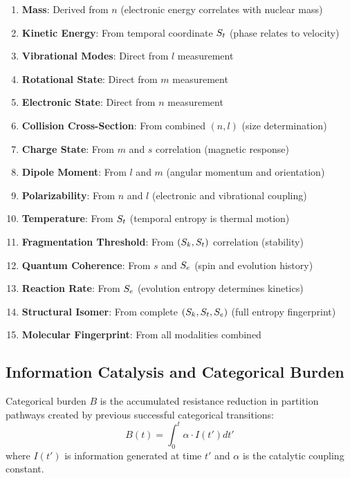 \begin{enumerate}
\item \textbf{Mass}: Derived from $n$ (electronic energy correlates with nuclear mass)
\item \textbf{Kinetic Energy}: From temporal coordinate $S_t$ (phase relates to velocity)
\item \textbf{Vibrational Modes}: Direct from $l$ measurement
\item \textbf{Rotational State}: Direct from $m$ measurement
\item \textbf{Electronic State}: Direct from $n$ measurement
\item \textbf{Collision Cross-Section}: From combined $(n,l)$ (size determination)
\item \textbf{Charge State}: From $m$ and $s$ correlation (magnetic response)
\item \textbf{Dipole Moment}: From $l$ and $m$ (angular momentum and orientation)
\item \textbf{Polarizability}: From $n$ and $l$ (electronic and vibrational coupling)
\item \textbf{Temperature}: From $S_t$ (temporal entropy is thermal motion)
\item \textbf{Fragmentation Threshold}: From $(S_k, S_t)$ correlation (stability)
\item \textbf{Quantum Coherence}: From $s$ and $S_e$ (spin and evolution history)
\item \textbf{Reaction Rate}: From $S_e$ (evolution entropy determines kinetics)
\item \textbf{Structural Isomer}: From complete $(S_k, S_t, S_e)$ (full entropy fingerprint)
\item \textbf{Molecular Fingerprint}: From all modalities combined
\end{enumerate}

\subsection{Information Catalysis and Categorical Burden}

\begin{definition}
\label{def:categorical_burden}
Categorical burden $B$ is the accumulated resistance reduction in partition pathways created by previous successful categorical transitions:
\begin{equation}
B(t) = \int_0^t \alpha \cdot I(t') dt'
\end{equation}
where $I(t')$ is information generated at time $t'$ and $\alpha$ is the catalytic coupling constant.
\end{definition}


